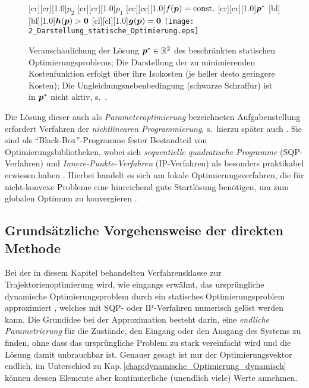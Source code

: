 \begin{figure}[ht]
[cr][cr][1.0]{$p_2$}
[cr][cr][1.0]{$p_1$}
[cc][cc][1.0]{$f(\boldsymbol{p})=\text{const.}$}
[cr][cr][1.0]{$\boldsymbol{p}^\ast$}
[bl][bl][1.0]{$\boldsymbol{h}(\boldsymbol{p}) > \boldsymbol{0}$}
[cl][cl][1.0]{$\boldsymbol{g}(\boldsymbol{p}) = \boldsymbol{0}$}
	\centering
  	\texttt{[image: 2\_Darstellung\_statische\_Optimierung.eps]}
		\vspace{-0.1cm}
  	\caption[Beschränktes statisches Optimierungsproblem]{Veranschaulichung der Lösung $\boldsymbol{p}^\ast \in \mathbb R^2$ des beschränkten statischen Optimierungsproblems; Die Darstellung der zu minimierenden Kostenfunktion erfolgt über ihre Isokosten (je heller desto geringere Kosten); Die Ungleichungsnebenbedingung (schwarze Schraffur) ist in $\boldsymbol{p}^\ast$ nicht aktiv, s.\ \zB \cite{nocedal2006numerical}.}
    \label{fig:stat_opt_problem}
\end{figure} 
Die Lösung dieser auch als \emph{Parameteroptimierung} bezeichneten Aufgabenstellung erfordert Verfahren der \emph{nichtlinearen Programmierung}, s.\ hierzu später auch . Sie sind als "`Black-Box"'-Programme fester Bestandteil von Optimierungsbibliotheken, wobei sich \emph{sequentielle quadratische Programme} (SQP-Verfahren) und \emph{Innere-Punkte-Verfahren} (IP-Verfahren) als besonders praktikabel erwiesen haben \cite{nocedal2006numerical, bertsekas2007, papageorgiou2012optimierung}. Hierbei handelt es sich um lokale Optimierungsverfahren, die für nicht-konvexe Probleme eine hinreichend gute Startlösung benötigen, um zum globalen Optimum zu konvergieren \cite{nocedal2006numerical}.




\subsection{Grundsätzliche Vorgehensweise der direkten Methode}
Bei der in diesem Kapitel behandelten Verfahrensklasse zur Trajektorienoptimierung wird, wie eingangs erwähnt, das ursprüngliche dynamische Optimierungsproblem durch ein statisches Optimierungsproblem approximiert \cite{papageorgiou2012optimierung}, welches mit SQP- oder IP-Verfahren numerisch gelöst werden kann. Die Grundidee bei der Approximation besteht darin, eine \emph{endliche Parametrierung} für die Zustände, den Eingang oder den Ausgang des Systems zu finden, ohne dass das ursprüngliche Problem zu stark vereinfacht wird und die Lösung damit unbrauchbar ist. 
Genauer gesagt ist nur der Optimierungsvektor endlich, im Unterschied zu Kap.\,\ref{chap:dynamische_Optimierung_dynamisch} können dessen Elemente aber kontinuierliche  (unendlich viele) Werte annehmen.

